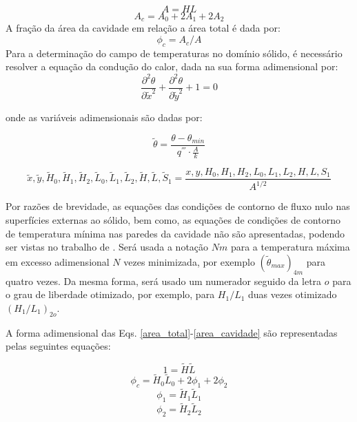 \documentclass[12pt,A4,A4pt]{article}
\begin{document}
\begin{equation}
A = HL \label{area_total}
\end{equation}
\begin{equation}
A_{c} = A_{0} + 2A_{1} + 2A_{2} \label{area_cavidade}
\end{equation}
A fração da área da cavidade em relação a área total é dada por:
\begin{equation}
\phi_{c} = A_{c}/A \label{fi}
\end{equation}
Para a determinação do campo de temperaturas no domínio sólido, é necessário resolver a equação da condução do calor, dada  na sua forma adimensional por:
\begin{equation}
\frac{\partial^{2} \theta}{\partial \tilde{x}^{2}}+\frac{\partial^{2} \theta}{\partial \tilde{y}^{2}}+1=0 \label{calor}
\end{equation}

onde as variáveis adimensionais são dadas por:

\begin{equation}
\tilde{\theta} = \frac{\theta - \theta_{min}}{q^{'''}\cdot\frac{A}{k}}\label{tadim}
\end{equation}

\begin{equation}
\tilde{x},\tilde{y},\tilde{H}_{0},\tilde{H}_{1},\tilde{H}_{2},\tilde{L}_{0},\tilde{L}_{1},\tilde{L}_{2},\tilde{H},\tilde{L},\tilde{S}_{1} = \frac{x,y,H_{0},H_{1},H_{2},L_{0},L_{1},L_{2},H,L,S_{1}}{A^{1/2}}\label{vadim}
\end{equation}

Por razões de brevidade, as equações das condições de contorno de fluxo nulo nas superfícies externas ao sólido, bem como, as equações de condições de contorno de temperatura mínima nas paredes da cavidade não são apresentadas, podendo ser vistas no trabalho de  \cite{Gonzales2015cilamce}. Será usada a notação $Nm$ para a temperatura máxima em excesso adimensional $N$ vezes minimizada, por exemplo $(\tilde{\theta} _{max})_{4m}$ para quatro vezes. Da mesma forma, será usado um numerador seguido da letra $o$ para o grau de liberdade otimizado, por exemplo, para $H_{1}/L_{1}$ duas vezes otimizado $(H_{1}/L_{1})_{2o}$.

A forma adimensional das Eqs. \ref{area_total}-\ref{area_cavidade} são representadas pelas seguintes equações:

\begin{equation}
1  = \tilde{H}\tilde{L}\label{total_area_adim}
\end{equation}
\begin{equation}
\phi_{c}=\tilde{H}_{0}\tilde{L}_{0}+2\phi_{1}+2\phi_{2}\label{fi_c}
\end{equation}
\begin{equation}
\phi_{1}=\tilde{H}_{1}\tilde{L}_{1}\label{fi_1}
\end{equation}
\begin{equation}
\phi_{2}=\tilde{H}_{2}\tilde{L}_{2}\label{fi_2}
\end{equation}
\end{document}
